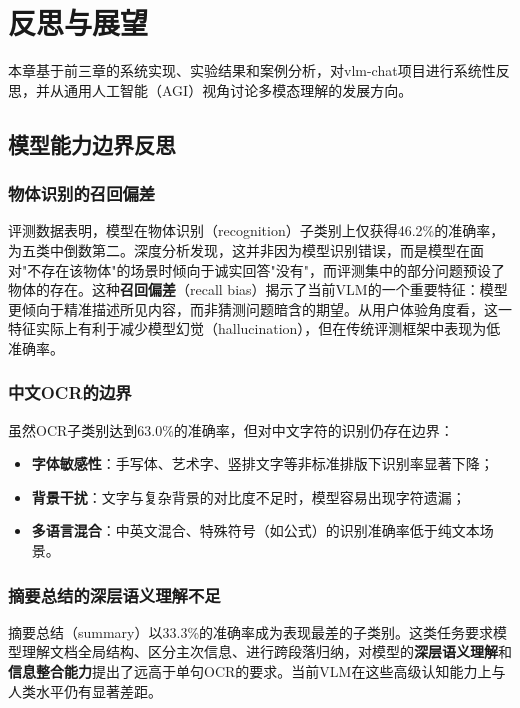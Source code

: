 
\chapter{反思与展望}
\label{cha:reflection}

本章基于前三章的系统实现、实验结果和案例分析，对vlm-chat项目进行系统性反思，并从通用人工智能（AGI）视角讨论多模态理解的发展方向。

\section{模型能力边界反思}

\subsection{物体识别的召回偏差}

评测数据表明，模型在物体识别（recognition）子类别上仅获得46.2\%的准确率，为五类中倒数第二。深度分析发现，这并非因为模型识别错误，而是模型在面对"不存在该物体"的场景时倾向于诚实回答"没有"，而评测集中的部分问题预设了物体的存在。这种\textbf{召回偏差}（recall bias）揭示了当前VLM的一个重要特征：模型更倾向于精准描述所见内容，而非猜测问题暗含的期望。从用户体验角度看，这一特征实际上有利于减少模型幻觉（hallucination），但在传统评测框架中表现为低准确率。

\subsection{中文OCR的边界}

虽然OCR子类别达到63.0\%的准确率，但对中文字符的识别仍存在边界：
\begin{itemize}
  \item \textbf{字体敏感性}：手写体、艺术字、竖排文字等非标准排版下识别率显著下降；
  \item \textbf{背景干扰}：文字与复杂背景的对比度不足时，模型容易出现字符遗漏；
  \item \textbf{多语言混合}：中英文混合、特殊符号（如公式）的识别准确率低于纯文本场景。
\end{itemize}

\subsection{摘要总结的深层语义理解不足}

摘要总结（summary）以33.3\%的准确率成为表现最差的子类别。这类任务要求模型理解文档全局结构、区分主次信息、进行跨段落归纳，对模型的\textbf{深层语义理解}和\textbf{信息整合能力}提出了远高于单句OCR的要求。当前VLM在这些高级认知能力上与人类水平仍有显著差距。

